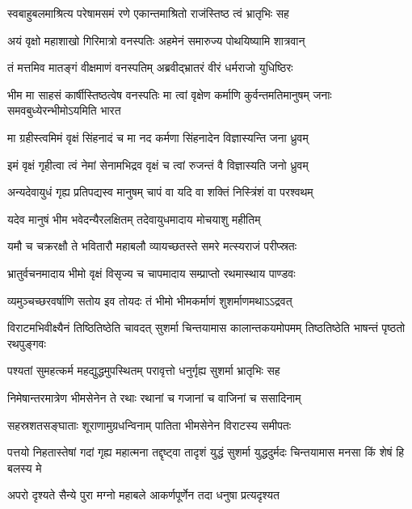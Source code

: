 \twolineshloka
{स्वबाहुबलमाश्रित्य परेषामसमं रणे}
{एकान्तमाश्रितो राजंस्तिष्ठ त्वं भ्रातृभिः सह}


\twolineshloka
{अयं वृक्षो महाशाखो गिरिमात्रो वनस्पतिः}
{अहमेनं समारुज्य पोथयिष्यामि शात्रवान्}



\twolineshloka
{तं मत्तमिव मातङ्गं वीक्षमाणं वनस्पतिम्}
{अब्रवीद्भ्रातरं वीरं धर्मराजो युधिष्ठिरः}


\onelineshloka
{भीम मा साहसं कार्षीस्तिष्ठत्वेष वनस्पतिः}
\twolineshloka
{मा त्वां वृक्षेण कर्माणि कुर्वन्तमतिमानुषम्}
{जनाः समवबुध्येरन्भीमोऽयमिति भारत}


\twolineshloka
{मा ग्रहीस्त्वमिमं वृक्षं सिंहनादं च मा नद}
{कर्मणा सिंहनादेन विज्ञास्यन्ति जना ध्रुवम्}


\twolineshloka
{इमं वृक्षं गृहीत्वा त्वं नेमां सेनामभिद्रव}
{वृक्षं च त्वां रुजन्तं वै विज्ञास्यति जनो ध्रुवम्}


\twolineshloka
{अन्यदेवायुधं गृह्य प्रतिपद्यस्व मानुषम्}
{चापं वा यदि वा शक्तिं निस्त्रिंशं वा परश्वथम्}


\twolineshloka
{यदेव मानुषं भीम भवेदन्यैरलक्षितम्}
{तदेवायुधमादाय मोचयाशु महीतिम्}


\twolineshloka
{यमौ च चक्ररक्षौ ते भवितारौ महाबलौ}
{व्यायच्छतस्ते समरे मत्स्यराजं परीप्स्रतः}



\twolineshloka
{भ्रातुर्वचनमादाय भीमो वृक्षं विसृज्य च}
{चापमादाय सम्प्राप्तो रथमास्थाय पाण्डवः}


\twolineshloka
{व्यमुञ्चच्छरवर्षाणि सतोय इव तोयदः}
{तं भीमो भीमकर्माणं शुशर्माणमथाऽऽद्रवत्}


\onelineshloka
{विराटमभिवीक्ष्यैनं तिष्ठितिष्ठेति चावदत्}
\twolineshloka
{सुशर्मा चिन्तयामास कालान्तकयमोपमम्}
{तिष्ठतिष्ठेति भाषन्तं पृष्ठतो रथपुङ्गवः}


\twolineshloka
{पश्यतां सुमहत्कर्म महद्युद्धमुपस्थितम्}
{परावृत्तो धनुर्गृह्य सुशर्मा भ्रातृभिः सह}


\twolineshloka
{निमेषान्तरमात्रेण भीमसेनेन ते रथाः}
{रथानां च गजानां च वाजिनां च ससादिनाम्}


\twolineshloka
{सहस्रशतसङ्घाताः शूराणामुग्रधन्विनाम्}
{पातिता भीमसेनेन विराटस्य समीपतः}


\onelineshloka
{पत्तयो निहतास्तेषां गदां गृह्य महात्मना}
\twolineshloka
{तद्दृष्ट्वा तादृशं युद्धं सुशर्मा युद्धदुर्मदः}
{चिन्तयामास मनसा किं शेषं हि बलस्य मे}


\twolineshloka
{अपरो दृश्यते सैन्ये पुरा मग्नो महाबले}
{आकर्णपूर्णेन तदा धनुषा प्रत्यदृश्यत}


